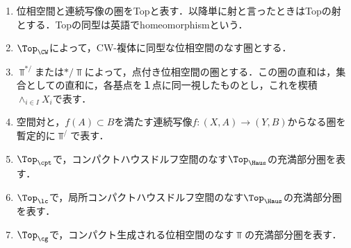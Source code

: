 \documentclass[uplatex, dvipdfmx]{jsreport}
\begin{document}


\begin{notation}[生息する圏]\mbox{}
    \begin{enumerate}
        \item 位相空間と連続写像の圏をTopと表す．以降単に射と言ったときはTopの射とする．Topの同型は英語でhomeomorphismという．
        \item $\Top_\CW$によって，CW-複体に同型な位相空間のなす圏とする．
        \item $\Top^{*/}$または$*/\Top$によって，点付き位相空間の圏とする．この圏の直和は，集合としての直和に，各基点を１点に同一視したものとし，これを楔積$\wedge_{i\in I}X_i$で表す．
        \item 空間対と，$f(A)\subset B$を満たす連続写像$f:(X,A)\to (Y,B)$からなる圏を暫定的に$\Top^{/}$で表す．
        \item $\Top_\cpt$で，コンパクトハウスドルフ空間のなす$\Top_\Haus$の充満部分圏を表す．
        \item $\Top_\lc$で，局所コンパクトハウスドルフ空間のなす$\Top_\Haus$の充満部分圏を表す．
        \item $\Top_\cg$で，コンパクト生成される位相空間のなす$\Top$の充満部分圏を表す．
    \end{enumerate}
\end{notation}
\end{document}
